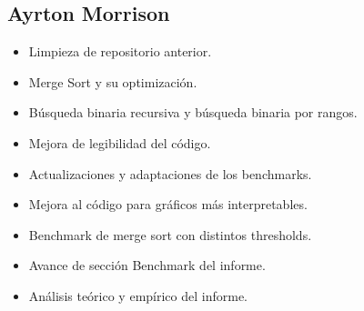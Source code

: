 \subsection{Ayrton Morrison}
\begin{itemize}
    \item Limpieza de repositorio anterior.
    \item Merge Sort y su optimización.
    \item Búsqueda binaria recursiva y búsqueda binaria por rangos.
    \item Mejora de legibilidad del código.
    \item Actualizaciones y adaptaciones de los benchmarks.
    \item Mejora al código para gráficos más interpretables.
    \item Benchmark de merge sort con distintos thresholds.
    \item Avance de sección Benchmark del informe.
    \item Análisis teórico y empírico del informe.
\end{itemize}